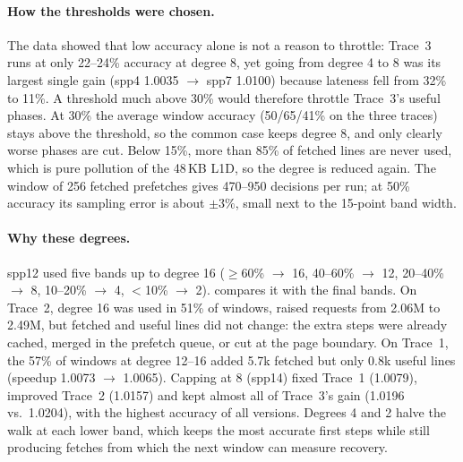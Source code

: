 \documentclass[12pt, a4paper]{article}
\begin{document}
\paragraph{How the thresholds were chosen.} The data showed that low accuracy
alone is not a reason to throttle: Trace~3 runs at only 22--24\% accuracy at
degree 8, yet going from degree 4 to 8 was its largest single gain (spp4
1.0035 $\to$ spp7 1.0100) because lateness fell from 32\% to 11\%. A threshold
much above 30\% would therefore throttle Trace~3's useful phases. At 30\% the
average window accuracy (50/65/41\% on the three traces) stays above the
threshold, so the common case keeps degree 8, and only clearly worse phases are
cut. Below 15\%, more than 85\% of fetched lines are never used, which is pure
pollution of the 48\,KB L1D, so the degree is reduced again. The window of 256
fetched prefetches gives 470--950 decisions per run; at 50\% accuracy its
sampling error is about $\pm3\%$, small next to the 15-point band width.

\paragraph{Why these degrees.} spp12 used five bands up to degree 16
($\ge$60\% $\to$ 16, 40--60\% $\to$ 12, 20--40\% $\to$ 8, 10--20\% $\to$ 4,
$<$10\% $\to$ 2).  compares it with the final bands. On
Trace~2, degree 16 was used in 51\% of windows, raised requests from 2.06M to
2.49M, but fetched and useful lines did not change: the extra steps were
already cached, merged in the prefetch queue, or cut at the page boundary. On
Trace~1, the 57\% of windows at degree 12--16 added 5.7k fetched but only
0.8k useful lines (speedup 1.0073 $\to$ 1.0065). Capping at 8 (spp14) fixed
Trace~1 (1.0079), improved Trace~2 (1.0157) and kept almost all of Trace~3's
gain (1.0196 vs.\ 1.0204), with the highest accuracy of all versions. Degrees
4 and 2 halve the walk at each lower band, which keeps the most accurate first
steps while still producing fetches from which the next window can measure
recovery.
\end{document}
